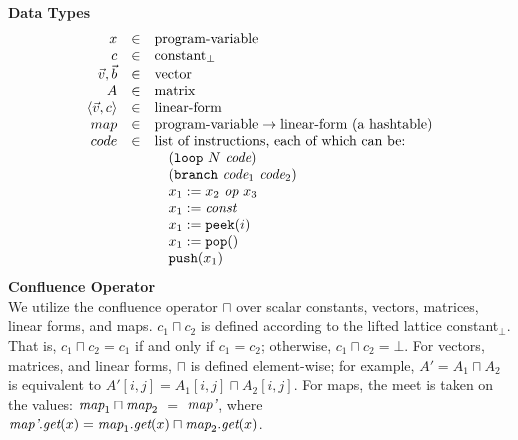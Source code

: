 \label{sec:dataflow}
\newcommand{\la}{$\leftarrow$}
\newcommand{\IND}{\begin{ALC@g}}
\newcommand{\UND}{\end{ALC@g}}
\newcommand{\tup}[2]{\langle{#1}, {#2}\rangle}

\begin{algorithm}
{\bf Data Types}
\begin{equation} \nonumber
\begin{array}{rcl}
x & \in & \mbox{program-variable} \\
c & \in & \mbox{constant}_{\bot} \\
\vec v, \vec b & \in & \mbox{vector} \\
A & \in & \mbox{matrix} \\
\tup{\vec v}{c} & \in & \mbox{linear-form} \\
map & \in & \mbox{program-variable} \rightarrow \mbox{linear-form  (a hashtable)} \\
code & \in & \mbox{list of instructions, each of which can be:} \\
~ & ~ & ~~~ (\mbox{{\tt loop}} ~N~ \mt{code}) \\
~ & ~ & ~~~ (\mbox{{\tt branch}} ~\mt{code}_1~ \mt{code}_2) \\
~ & ~ & ~~~ x_1 := x_2~\mt{op}~x_3 \\
~ & ~ & ~~~ x_1 := \mt{const} \\
~ & ~ & ~~~ x_1 := \mbox{\tt peek}(i) \\
~ & ~ & ~~~ x_1 := \mbox{\tt pop}() \\
~ & ~ & ~~~ \mbox{{\tt push}}(x_1)
\end{array} 
\end{equation}
{\bf Confluence Operator} \\ 
%
We utilize the confluence operator $\sqcap$ over scalar constants,
vectors, matrices, linear forms, and maps.  $c_1 \sqcap c_2$ is
defined according to the lifted lattice constant$_{\bot}$.  That is,
$c_1 \sqcap c_2 = c_1$ if and only if $c_1 = c_2$; otherwise, $c_1
\sqcap c_2 = \bot$.  For vectors, matrices, and linear forms, $\sqcap$
is defined element-wise; for example, $A' = A_1 \sqcap A_2$ is
equivalent to $A'[i,j] = A_1[i,j] \sqcap A_2[i,j]$.  For maps, the
meet is taken on the values: $\mbox{\it map}_1 \sqcap \mbox{\it map}_2$ $=$
$\mbox{\it map'}$, where $\mbox{\it map'}.\mbox{\it get}(x) = \mbox{\it map}_1.\mbox{\it get}(x)
\sqcap \mbox{\it map}_2.\mbox{\it get}(x)$.
~ \\ ~ \\

\end{algorithm}
